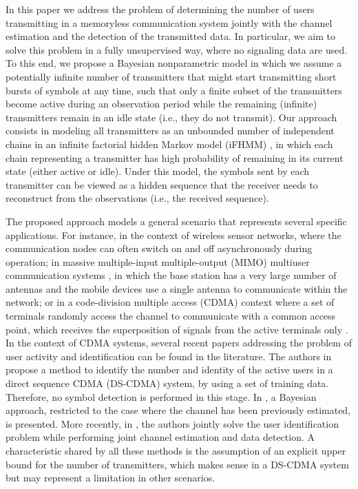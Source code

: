 \documentclass[a4paper]{article}
\begin{document}
In this paper we address the problem of determining the number of users transmitting in a memoryless communication
system jointly with the channel estimation and the detection of the transmitted data. In particular, we aim to solve this problem in a fully unsupervised way, where no signaling data are used. To this end, we propose a Bayesian nonparametric model in which we assume a potentially infinite number of transmitters that might start transmitting short bursts of symbols at any time, such that only a finite subset of the transmitters become active during an observation period while the remaining (infinite) transmitters remain in an idle state (i.e., they do not transmit). 
%
Our approach consists in modeling all transmitters as an unbounded number of independent chains in an infinite factorial hidden Markov model (iFHMM) \cite{IFHMM}, in which each chain representing a transmitter has high probability of remaining in its current state (either active or idle). Under this model, the symbols sent by each transmitter can be viewed as a hidden sequence that the receiver needs to reconstruct from the observations (i.e., the received sequence). 


The proposed approach  models a general scenario that represents several specific applications. For instance, in the context of wireless sensor networks, where the communication nodes can often switch on and off asynchronously during operation; in massive multiple-input multiple-output (MIMO) multiuser communication systems \cite{Hoydis13}, in which the base station has a very large number of antennas and the mobile devices use a single antenna to communicate within the network; or in a code-division multiple access (CDMA) context where a set of terminals randomly access the channel to communicate with a common access point, which receives the superposition of signals from the active terminals only \cite{Vazquez2013}. In the context of CDMA systems, several recent papers addressing the problem of user activity and identification can be found in the literature. The authors in \cite{AD10} propose a method to identify the number and identity of the active users in a direct sequence CDMA (DS-CDMA) system, by using a set of training data. Therefore, no symbol detection is performed in this stage.  In \cite{AD11}, a Bayesian approach, restricted to the case where the channel has been previously estimated, is presented. More recently, in \cite{Vazquez2013}, the authors jointly solve the user identification problem while performing joint channel estimation and
data detection. 
%
A characteristic shared by all these methods is the assumption of an explicit upper bound for the number of transmitters, which makes sense in a DS-CDMA system but may represent a limitation in other scenarios.
\end{document}
